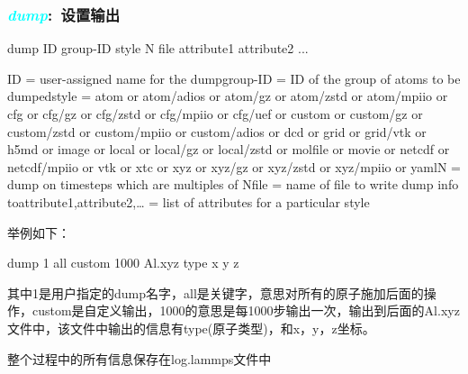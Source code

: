 \frame
{
	\frametitle{\textcolor{cyan}{\textit{dump}}:~设置输出}
	dump ID group-ID style N file attribute1 attribute2 ...

    ID = user-assigned name for the dumpgroup-ID = ID of the group of atoms to be dumpedstyle = atom or atom/adios or atom/gz or atom/zstd or atom/mpiio or cfg or cfg/gz or cfg/zstd or cfg/mpiio or cfg/uef or custom or custom/gz or custom/zstd or custom/mpiio or custom/adios or dcd or grid or grid/vtk or h5md or image or local or local/gz or local/zstd or molfile or movie or netcdf or netcdf/mpiio or vtk or xtc or xyz or xyz/gz or xyz/zstd or xyz/mpiio or yamlN = dump on timesteps which are multiples of Nfile = name of file to write dump info toattribute1,attribute2,… = list of attributes for a particular style

举例如下：

dump 1 all custom 1000 Al.xyz type x y z

其中1是用户指定的dump名字，all是关键字，意思对所有的原子施加后面的操作，custom是自定义输出，1000的意思是每1000步输出一次，输出到后面的Al.xyz文件中，该文件中输出的信息有type(原子类型)，和x，y，z坐标。

整个过程中的所有信息保存在log.lammps文件中
}

